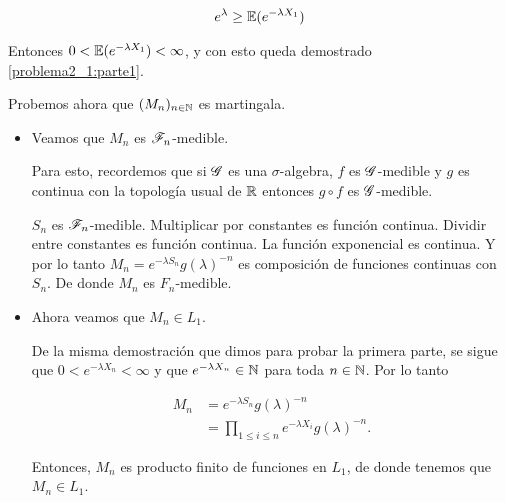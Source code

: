     \begin{align}
        e^{\lambda} \geq  \mathbb{E}(e^{- \lambda X_1})
    \end{align}\par\null    
    
    Entonces $0 < \mathbb{E}(e^{-\lambda X_1}) < \infty$, y con esto queda demostrado \eqref{problema2_1:parte1}.\par\null
    
    Probemos ahora que $(M_n)_{n \in \mathbb{N}}$ es martingala.
    
    \begin{itemize}
        \item 
            Veamos que $M_n$ es $\mathscr{F}_n$-medible.\par\null
            
            Para esto, recordemos que si $\mathscr{G}$ es una $\sigma$-algebra, $f$ es $\mathscr{G}$-medible y $g$ es continua
            con la topología usual de $\mathbb{R}$ entonces $g \circ f$ es $\mathscr{G}$-medible.\par\null
            
            $S_n$ es $\mathscr{F}_n$-medible. Multiplicar por constantes es función continua. Dividir entre constantes 
            es función continua. La función exponencial es continua. Y por lo tanto $M_n=e^{-\lambda S_n}g(\lambda)^{-n}$ 
            es composición de funciones continuas con $S_n$. De donde $M_n$ es $F_n$-medible.\par\null
         
        \item 
            Ahora veamos que $M_n \in L_1$.\par\null
            
            De la misma demostración que dimos para probar la primera parte, se sigue 
            que $0 < e^{-\lambda X_n} < \infty$ y que $e^{-\lambda X_n} \in \mathbb{N}$ para toda $n \in \mathbb{N}$. Por lo tanto
            
            \begin{align}
                M_n         &=      e^{-\lambda S_n}g(\lambda)^{-n} \\
                            &=      \prod_{1 \leq i \leq n} e^{-\lambda X_i} g(\lambda)^{-n}. 
            \end{align}\par\null
            
            Entonces, $M_n$ es producto finito de funciones en $L_1$, de donde tenemos que $M_n \in L_1$.\par\null
            

\end{itemize}
